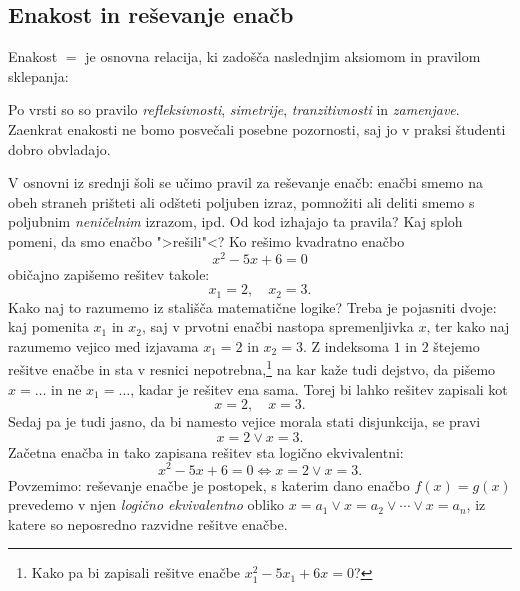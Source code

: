 \subsection{Enakost in reševanje enačb}
\label{sec:enakost}

Enakost $=$ je osnovna relacija, ki zadošča naslednjim aksiomom in
pravilom sklepanja:
%
%
Po vrsti so so pravilo \emph{refleksivnosti}, \emph{simetrije},
\emph{tranzitivnosti} in \emph{zamenjave}. Zaenkrat enakosti ne bomo
posvečali posebne pozornosti, saj jo v praksi študenti dobro
obvladajo.

V osnovni iz srednji šoli se učimo pravil za reševanje enačb: enačbi
smemo na obeh straneh prišteti ali odšteti poljuben izraz, pomnožiti
ali deliti smemo s poljubnim \emph{neničelnim} izrazom, ipd. Od kod
izhajajo ta pravila? Kaj sploh pomeni, da smo enačbo ">rešili"<? Ko
rešimo kvadratno enačbo
%
\begin{equation*}
  x^2 - 5 x + 6 = 0
\end{equation*}
%
običajno zapišemo rešitev takole:
%
\begin{equation*}
  x_1 = 2, \quad x_2 = 3.
\end{equation*}
%
Kako naj to razumemo iz stališča matematične logike? Treba je
pojasniti dvoje: kaj pomenita $x_1$ in $x_2$, saj v prvotni enačbi
nastopa spremenljivka $x$, ter kako naj razumemo vejico med izjavama
$x_1 = 2$ in $x_2 = 3$. Z indeksoma $1$ in $2$ štejemo rešitve enačbe
in sta v resnici nepotrebna,\footnote{Kako pa bi zapisali rešitve
  enačbe $x_1^2 - 5 x_1 + 6 x = 0$?} na kar kaže tudi dejstvo, da
pišemo $x = \ldots$ in ne $x_1 = \ldots$, kadar je rešitev ena sama.
Torej bi lahko rešitev zapisali kot
%
\begin{equation*}
  x = 2, \quad x = 3.
\end{equation*}
%
Sedaj pa je tudi jasno, da bi namesto vejice morala stati disjunkcija,
se pravi
%
\begin{equation*}
  x = 2 \lor x = 3.
\end{equation*}
%
Začetna enačba in tako zapisana rešitev sta logično ekvivalentni:
%
\begin{equation*}
  x^2 - 5 x + 6 = 0 \iff
  x = 2 \lor x = 3.
\end{equation*}
%
Povzemimo: reševanje enačbe je postopek, s katerim dano enačbo $f(x) =
g(x)$ prevedemo v njen \emph{logično ekvivalentno} obliko $x = a_1
\lor x = a_2 \lor \cdots \lor x = a_n$, iz katere so neposredno razvidne
rešitve enačbe.

